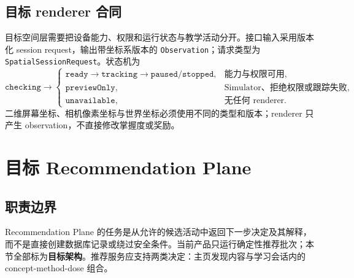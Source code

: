 \documentclass[11pt,a4paper,fontset=none]{ctexart}
\newcommand{\code}[1]{\begingroup\urlstyle{tt}\nolinkurl{#1}\endgroup}
\newcommand{\target}{\textcolor{LumapTarget}{\textbf{目标架构}}}
\begin{document}
\subsection{目标 renderer 合同}
目标空间层需要把设备能力、权限和运行状态与教学活动分开。接口输入采用版本化 session request，输出带坐标系版本的 \code{Observation}；请求类型为 \texttt{SpatialSession}\allowbreak\texttt{Request}。状态机为
\begin{equation}
  \texttt{checking}\rightarrow
  \left\{
    \begin{array}{ll}
      \texttt{ready}\rightarrow\texttt{tracking}\rightarrow\texttt{paused/stopped}, & \text{能力与权限可用},\\
      \texttt{previewOnly}, & \text{Simulator、拒绝权限或跟踪失败},\\
      \texttt{unavailable}, & \text{无任何 renderer}.
    \end{array}
  \right.
\end{equation}
二维屏幕坐标、相机像素坐标与世界坐标必须使用不同的类型和版本；renderer 只产生 observation，不直接修改掌握度或奖励。

\section{目标 Recommendation Plane}
\label{sec:recommendation}

\subsection{职责边界}
Recommendation Plane 的任务是从允许的候选活动中返回下一步决定及其解释，而不是直接创建数据库记录或绕过安全条件。当前产品只运行确定性推荐批次；本节全部标为\target。推荐服务应支持两类决定：主页发现内容与学习会话内的 concept-method-dose 组合。
\end{document}
